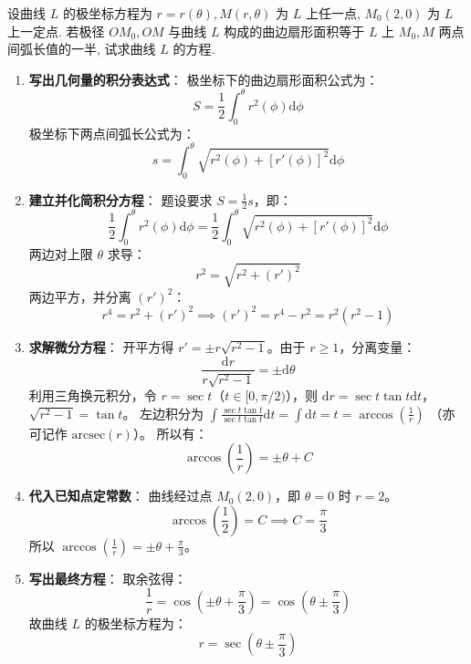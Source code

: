 \documentclass[lang=cn,11pt]{elegantbook}
\begin{document}
\begin{exercise}[微分方程的几何应用]
设曲线 $L$ 的极坐标方程为 $r=r(\theta), M(r,\theta)$ 为 $L$ 上任一点, $M_0(2,0)$ 为 $L$ 上一定点. 若极径 $OM_0, OM$ 与曲线 $L$ 构成的曲边扇形面积等于 $L$ 上 $M_0, M$ 两点间弧长值的一半, 试求曲线 $L$ 的方程.
\end{exercise}
\begin{solution}
\begin{enumerate}
    \item \textbf{写出几何量的积分表达式}：
    极坐标下的曲边扇形面积公式为：
    \[
    S = \frac{1}{2} \int_0^\theta r^2(\phi) \mathrm{d}\phi
    \]
    极坐标下两点间弧长公式为：
    \[
    s = \int_0^\theta \sqrt{r^2(\phi) + [r'(\phi)]^2} \mathrm{d}\phi
    \]
    
    \item \textbf{建立并化简积分方程}：
    题设要求 $S = \frac{1}{2} s$，即：
    \[
    \frac{1}{2} \int_0^\theta r^2(\phi) \mathrm{d}\phi = \frac{1}{2} \int_0^\theta \sqrt{r^2(\phi) + [r'(\phi)]^2} \mathrm{d}\phi
    \]
    两边对上限 $\theta$ 求导：
    \[
    r^2 = \sqrt{r^2 + (r')^2}
    \]
    两边平方，并分离 $(r')^2$：
    \[
    r^4 = r^2 + (r')^2 \implies (r')^2 = r^4 - r^2 = r^2(r^2 - 1)
    \]
    
    \item \textbf{求解微分方程}：
    开平方得 $r' = \pm r\sqrt{r^2-1}$。由于 $r \ge 1$，分离变量：
    \[
    \frac{\mathrm{d}r}{r\sqrt{r^2-1}} = \pm \mathrm{d}\theta
    \]
    利用三角换元积分，令 $r = \sec t$（$t \in [0, \pi/2)$），则 $\mathrm{d}r = \sec t \tan t \mathrm{d}t$，$\sqrt{r^2-1} = \tan t$。
    左边积分为 $\int \frac{\sec t \tan t}{\sec t \tan t} \mathrm{d}t = \int \mathrm{d}t = t = \arccos\left(\frac{1}{r}\right)$ （亦可记作 $\text{arcsec}(r)$）。
    所以有：
    \[
    \arccos\left(\frac{1}{r}\right) = \pm \theta + C
    \]
    
    \item \textbf{代入已知点定常数}：
    曲线经过点 $M_0(2,0)$，即 $\theta=0$ 时 $r=2$。
    \[
    \arccos\left(\frac{1}{2}\right) = C \implies C = \frac{\pi}{3}
    \]
    所以 $\arccos\left(\frac{1}{r}\right) = \pm \theta + \frac{\pi}{3}$。
    
    \item \textbf{写出最终方程}：
    取余弦得：
    \[
    \frac{1}{r} = \cos\left(\pm \theta + \frac{\pi}{3}\right) = \cos\left(\theta \pm \frac{\pi}{3}\right)
    \]
    故曲线 $L$ 的极坐标方程为：
    \[
    r = \sec\left(\theta \pm \frac{\pi}{3}\right)
    \]
\end{enumerate}
\end{solution}
\end{document}
